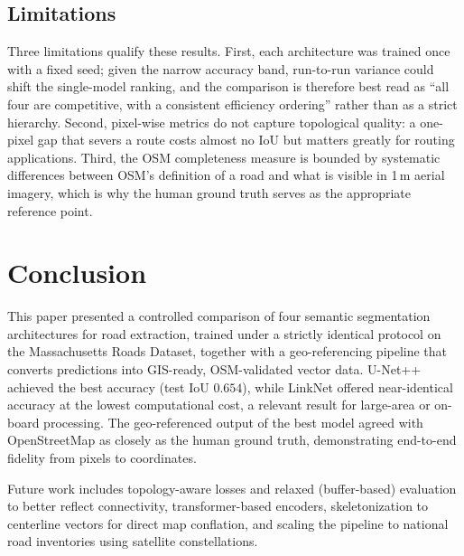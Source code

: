 \documentclass[conference]{IEEEtran}
\begin{document}
\subsection{Limitations}
Three limitations qualify these results. First, each architecture was trained
once with a fixed seed; given the narrow accuracy band, run-to-run variance
could shift the single-model ranking, and the comparison is therefore best
read as ``all four are competitive, with a consistent efficiency ordering''
rather than as a strict hierarchy. Second, pixel-wise metrics do not capture
topological quality: a one-pixel gap that severs a route costs almost no IoU
but matters greatly for routing applications. Third, the OSM completeness
measure is bounded by systematic differences between OSM's definition of a
road and what is visible in 1\,m aerial imagery, which is why the human
ground truth serves as the appropriate reference point.

\section{Conclusion}
This paper presented a controlled comparison of four semantic segmentation
architectures for road extraction, trained under a strictly identical
protocol on the Massachusetts Roads Dataset, together with a geo-referencing
pipeline that converts predictions into GIS-ready, OSM-validated vector data.
U-Net++ achieved the best accuracy (test IoU $0.654$), while LinkNet offered
near-identical accuracy at the lowest computational cost, a relevant result
for large-area or on-board processing. The geo-referenced output of the best
model agreed with OpenStreetMap as closely as the human ground truth,
demonstrating end-to-end fidelity from pixels to coordinates.

Future work includes topology-aware losses and relaxed (buffer-based)
evaluation to better reflect connectivity, transformer-based encoders,
skeletonization to centerline vectors for direct map conflation, and scaling
the pipeline to national road inventories using satellite constellations.
\end{document}
